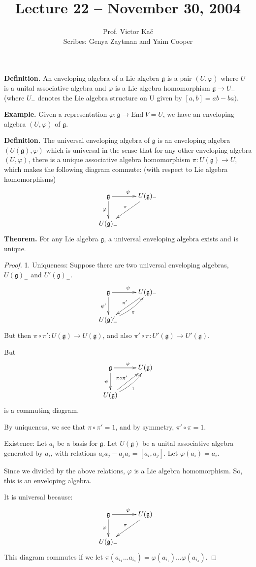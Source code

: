 \documentclass[12pt, fullpage]{article}
\title{Lecture 22  -- November 30, 2004}
\author{Prof. Victor Ka\v{c}\\ Scribes: Genya Zaytman and Yaim Cooper}
\date{}
\newcommand{\g}{\mathfrak{g}}
\begin{document}
  
\maketitle
  
\setcounter{section}{22}


{\bf Definition.}  An enveloping algebra of a Lie algebra $\g$ is a pair $(U, \varphi)$ where $U$ is a unital associative algebra and $\varphi$ is a Lie algebra homomorphism $\g\rightarrow U_-$ (where $U_-$ denotes the Lie algebra structure on U given by $[a,b] = ab-ba)$.    

{\bf Example.}  Given a representation $\varphi :\g\rightarrow \mathrm{End\ } V = U$, we have an enveloping algebra $(U, \varphi)$ of $\g$.  

{\bf Definition.}  The universal enveloping algebra of $\g$ is an enveloping algebra $(U(\g), \varphi )$ which is universal in the sense that for any other enveloping algebra $(U,\varphi)$, there is a unique associative algebra homomorphism $\pi : U(\g) \rightarrow U$, which makes the following diagram commute: (with respect to Lie algebra homomorphisms)
$$\xymatrix{ \g \ar[r]^{\psi} \ar[d]_{\varphi}  & U(\g)_- \ar[dl]_\pi \\
U(\g)_-}$$
{\bf Theorem.}  For any Lie algebra $\g$, a universal enveloping algebra exists and is unique.

\begin{proof}
1.  Uniqueness:  Suppose there are two universal enveloping algebras, $U(\g)_-$ and $U'(\g)_-$.  
$$\xymatrix{ \g \ar[r]^{\psi} \ar[d]_{\psi'}  & U(\g)_- \ar[dl]_{\pi'} \\
U(\g)'_- \ar@/_/[ur]_\pi}$$
But then $\pi \circ \pi' : U(\g) \rightarrow U(\g)$, and also $\pi' \circ \pi : U'(\g) \rightarrow U'(\g)$.  

But $$\xymatrix{ \g \ar[r]^{\varphi} \ar[d]_{\psi} & U(\g) \\
U(\g) \ar[ur]^{\pi \circ \pi'} \ar@/_/[ur]_1}$$ is a commuting diagram.  

By uniqueness, we see that $\pi \circ \pi' = 1$, and by symmetry, $\pi' \circ \pi = 1$.  

Existence:  Let $a_i$ be a basis for $\g$.  Let $U(\g)$ be a unital associative algebra generated by $a_i$, with relations $a_i a_j - a_j a_i = [a_i , a_j]$.  Let $\varphi (a_i) = a_i$.  

Since we divided by the above relations, $\varphi$ is a Lie algebra homomorphism.  So, this is an enveloping algebra.  

It is universal because:
$$\xymatrix{ \g \ar[r]^{\psi} \ar[d]_{\varphi}  & U(\g)_- \ar[dl]_\pi \\
U(\g)_-}$$
This diagram commutes if we let $\pi (a_{i_1} ... a_{i_s}) = \varphi (a_{i_1}) ... \varphi (a_{i_s})$.  

\end{proof}
\end{document}
